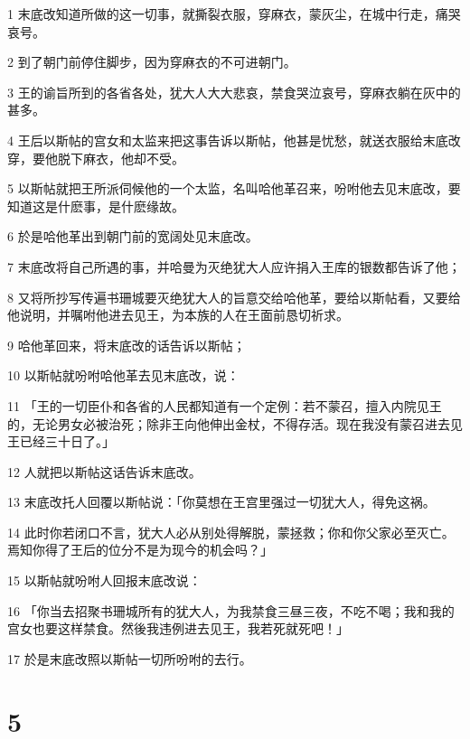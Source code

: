 \par 1 末底改知道所做的这一切事，就撕裂衣服，穿麻衣，蒙灰尘，在城中行走，痛哭哀号。
\par 2 到了朝门前停住脚步，因为穿麻衣的不可进朝门。
\par 3 王的谕旨所到的各省各处，犹大人大大悲哀，禁食哭泣哀号，穿麻衣躺在灰中的甚多。
\par 4 王后以斯帖的宫女和太监来把这事告诉以斯帖，他甚是忧愁，就送衣服给末底改穿，要他脱下麻衣，他却不受。
\par 5 以斯帖就把王所派伺候他的一个太监，名叫哈他革召来，吩咐他去见末底改，要知道这是什麽事，是什麽缘故。
\par 6 於是哈他革出到朝门前的宽阔处见末底改。
\par 7 末底改将自己所遇的事，并哈曼为灭绝犹大人应许捐入王库的银数都告诉了他；
\par 8 又将所抄写传遍书珊城要灭绝犹大人的旨意交给哈他革，要给以斯帖看，又要给他说明，并嘱咐他进去见王，为本族的人在王面前恳切祈求。
\par 9 哈他革回来，将末底改的话告诉以斯帖；
\par 10 以斯帖就吩咐哈他革去见末底改，说：
\par 11 「王的一切臣仆和各省的人民都知道有一个定例：若不蒙召，擅入内院见王的，无论男女必被治死；除非王向他伸出金杖，不得存活。现在我没有蒙召进去见王已经三十日了。」
\par 12 人就把以斯帖这话告诉末底改。
\par 13 末底改托人回覆以斯帖说：「你莫想在王宫里强过一切犹大人，得免这祸。
\par 14 此时你若闭口不言，犹大人必从别处得解脱，蒙拯救；你和你父家必至灭亡。焉知你得了王后的位分不是为现今的机会吗？」
\par 15 以斯帖就吩咐人回报末底改说：
\par 16 「你当去招聚书珊城所有的犹大人，为我禁食三昼三夜，不吃不喝；我和我的宫女也要这样禁食。然後我违例进去见王，我若死就死吧！」
\par 17 於是末底改照以斯帖一切所吩咐的去行。

\chapter{5}

